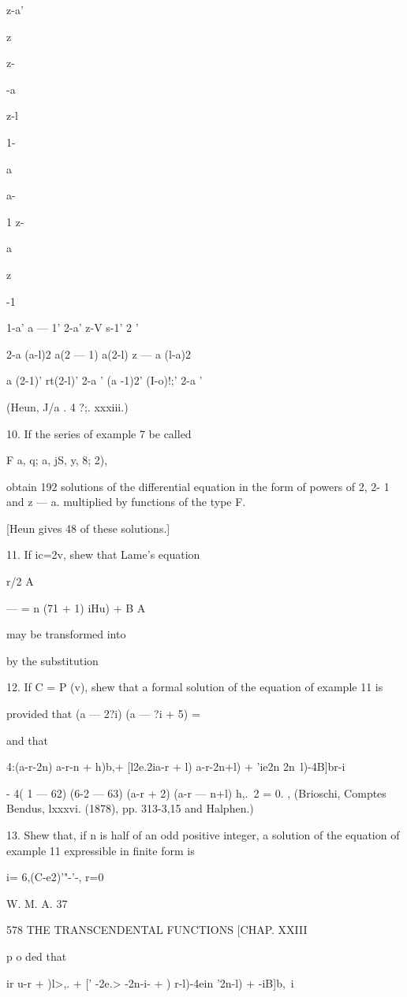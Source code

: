 {{{{{{{{z-a'

z

z-

-a

z-l

1-

 a

a-

1 z-

 a

z

-1

1-a' a — 1' 2-a' z-V s-1' 2 '

2-a (a-l)2 a(2 — 1) a(2-l) z — a (l-a)2

a (2-1)' rt(2-l)' 2-a ' (a -1)2' (I-o)!;' 2-a '

(Heun, J/a . 4 ?;. xxxiii.)

10. If the series of example 7 be called

F a, q; a, jS, y, 8; 2),

obtain 192 solutions of the differential equation in the form of
powers of 2, 2- 1 and z — a. multiplied by functions of the type F.

[Heun gives 48 of these solutions.]

11. If ic=2v, shew that Lame's equation

r/2 A

— = n (71 + 1) iHu) + B A

may be transformed into

by the substitution

12. If C = P (v), shew that a formal solution of the equation of
example 11 is

provided that (a — 2?i) (a — ?i + 5) =

and that

4:(a-r-2n) a-r-n + h)b,+ [l2e.2ia-r + l) a-r-2n+l) + 'ie2n
2n~l)-4B]br-i

- 4( 1 — 62) (6-2 — 63) (a-r + 2) (a-r — n+l) h,.\ 2 = 0. , (Brioschi,
Comptes Bendus, lxxxvi. (1878), pp. 313-3,15 and Halphen.)

13. Shew that, if n is half of an odd positive integer, a solution of
the equation of example 11 expressible in finite form is

i= 6,(C-e2)'"-'-, r=0

W. M. A. 37

578 THE TRANSCENDENTAL FUNCTIONS [CHAP. XXIII

p o ded that

 ir u-r + )l>,. + [' -2e.> -2n-i- + ) r-l)-4ein '2n-l) + -iB]b,\ i

}}}}}}}}
